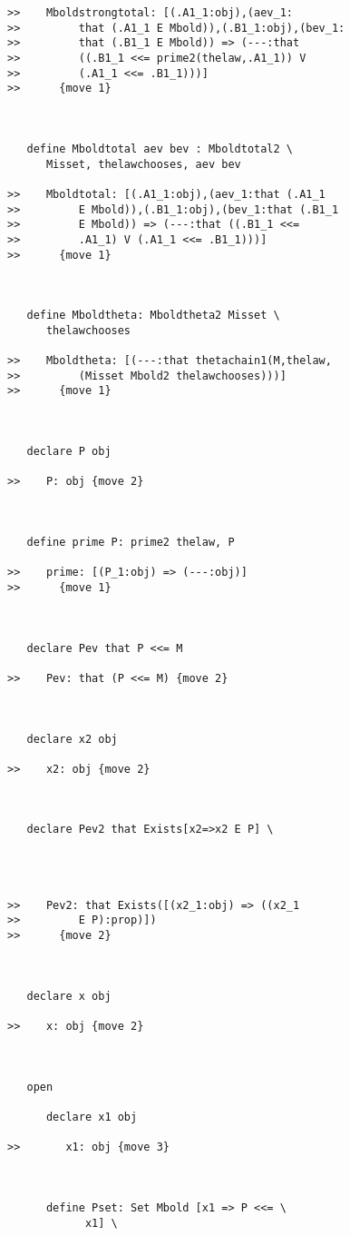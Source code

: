 \documentclass[12pt]{article}
\begin{document}
\begin{verbatim}
>>    Mboldstrongtotal: [(.A1_1:obj),(aev_1:
>>         that (.A1_1 E Mbold)),(.B1_1:obj),(bev_1:
>>         that (.B1_1 E Mbold)) => (---:that
>>         ((.B1_1 <<= prime2(thelaw,.A1_1)) V
>>         (.A1_1 <<= .B1_1)))]
>>      {move 1}



   define Mboldtotal aev bev : Mboldtotal2 \
      Misset, thelawchooses, aev bev

>>    Mboldtotal: [(.A1_1:obj),(aev_1:that (.A1_1
>>         E Mbold)),(.B1_1:obj),(bev_1:that (.B1_1
>>         E Mbold)) => (---:that ((.B1_1 <<=
>>         .A1_1) V (.A1_1 <<= .B1_1)))]
>>      {move 1}



   define Mboldtheta: Mboldtheta2 Misset \
      thelawchooses

>>    Mboldtheta: [(---:that thetachain1(M,thelaw,
>>         (Misset Mbold2 thelawchooses)))]
>>      {move 1}



   declare P obj

>>    P: obj {move 2}



   define prime P: prime2 thelaw, P

>>    prime: [(P_1:obj) => (---:obj)]
>>      {move 1}



   declare Pev that P <<= M

>>    Pev: that (P <<= M) {move 2}



   declare x2 obj

>>    x2: obj {move 2}



   declare Pev2 that Exists[x2=>x2 E P] \
      



>>    Pev2: that Exists([(x2_1:obj) => ((x2_1
>>         E P):prop)])
>>      {move 2}



   declare x obj

>>    x: obj {move 2}



   open

      declare x1 obj

>>       x1: obj {move 3}



      define Pset: Set Mbold [x1 => P <<= \
            x1] \
         




\end{verbatim}
\end{document}
